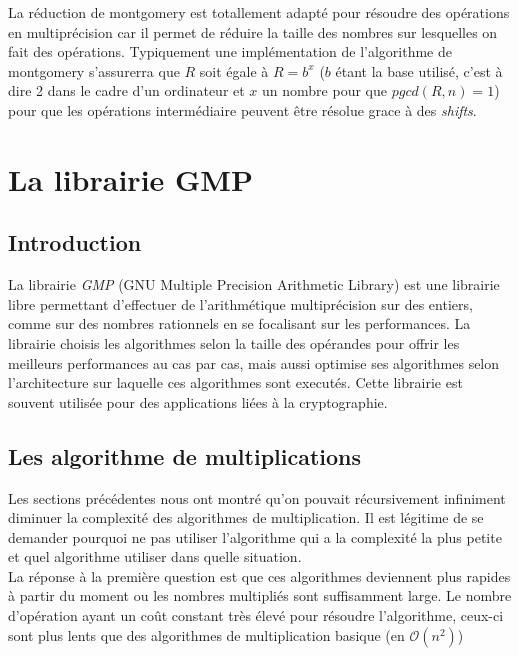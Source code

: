 \documentclass[letterpaper]{article}
\begin{document}
La réduction de montgomery est totallement adapté pour résoudre des opérations
en multiprécision car il permet de réduire la taille des nombres sur lesquelles
on fait des opérations. Typiquement une implémentation de l'algorithme de
montgomery s'assurerra que $R$ soit égale à $R = b^{x}$ ($b$ étant la base utilisé,
c'est à dire 2 dans le cadre d'un ordinateur et $x$ un nombre pour que
$pgcd(R, n) = 1$) pour que les opérations intermédiaire peuvent être résolue
grace à des \emph{shifts}\cite{djguan2003montgomery}.



\section{La librairie GMP}

\subsection{Introduction}

La librairie \emph{GMP} (GNU Multiple Precision Arithmetic Library) est une
librairie libre permettant d'effectuer de l'arithmétique multiprécision sur
des entiers, comme sur des nombres rationnels en se focalisant sur les
performances. La librairie choisis les algorithmes selon la taille des
opérandes pour offrir les meilleurs performances au cas par cas, mais aussi
optimise ses algorithmes selon l'architecture sur laquelle ces algorithmes sont
executés.
\newline
Cette librairie est souvent utilisée pour des applications liées à la
cryptographie\cite{wikigmp}.

\subsection{Les algorithme de multiplications}

Les sections précédentes nous ont montré qu'on pouvait récursivement
infiniment diminuer la complexité des algorithmes de multiplication.
Il est légitime de se demander pourquoi ne pas utiliser l'algorithme
qui a la complexité la plus petite et quel algorithme utiliser dans
quelle situation.\\

La réponse à la première question est que ces algorithmes deviennent
plus rapides à partir du moment ou les nombres multipliés sont
suffisamment large. Le nombre d'opération ayant un coût constant
très élevé pour résoudre l'algorithme, ceux-ci sont plus lents
que des algorithmes de multiplication basique (en $\mathcal{O}(n^2)$)\\
\end{document}
